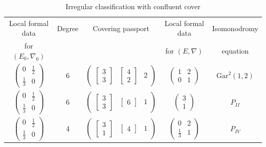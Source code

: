 \documentclass[12]{amsart}
\begin{document}
\begin{table}[h]
\caption{Irregular classification with confluent cover}
\begin{center}
\begin{tabular}{|c|c|c|c|c|}
\hline 
Local formal data  & Degree & Covering passport & Local formal data & Isomonodromy \\
for $(E_0,\nabla_0)$ &&& for $(E,\nabla)$& equation\\
\hline
$\begin{pmatrix}0& \frac{1}{2}\\ \frac{1}{3} & 0\end{pmatrix}$ & 6 &
$\begin{pmatrix}  \left[\begin{matrix}3\\3\end{matrix}\right]  & \left[\begin{matrix}4\\2\end{matrix}\right] &  2\end{pmatrix}$ &
$\begin{pmatrix}1&2\\ 0 & 1\end{pmatrix}$& $\mathrm{Gar}^2(1,2)$ \\
\hline
$\begin{pmatrix}0& \frac{1}{2}\\ \frac{1}{3} & 0\end{pmatrix}$ & 6 &
$\begin{pmatrix}  \left[\begin{matrix}3\\3\end{matrix}\right]  & \left[\begin{matrix}6\end{matrix}\right] &  1\end{pmatrix}$ &
$\begin{pmatrix}3\\  1\end{pmatrix}$& $P_{II}$ \\
\hline
$\begin{pmatrix}0& \frac{1}{2}\\ \frac{1}{3} & 0\end{pmatrix}$ & 4 &
$\begin{pmatrix}   \left[\begin{matrix}3\\1\end{matrix}\right] & \left[\begin{matrix}4\end{matrix}\right]  & 1\end{pmatrix}$ &
$\begin{pmatrix}0& 2\\ \frac{1}{3} & 1\end{pmatrix}$ & $P_{IV}$\\
\hline
\end{tabular}
\end{center}
\label{table:irregularConfl}
\end{table}
\end{document}
